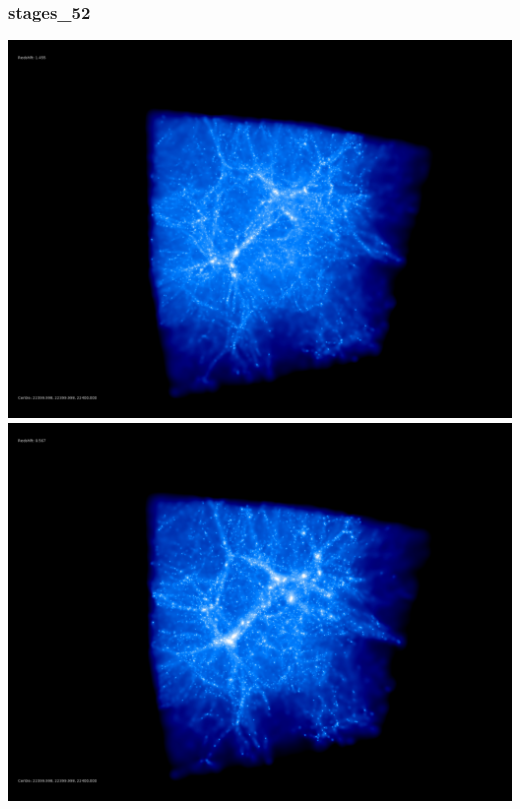 \subsubsection{stages\_52}
\includegraphics[scale=0.1]{r256/h100/stages_52/50.jpg} 
\includegraphics[scale=0.1]{r256/h100/stages_52/100.jpg}  \\

